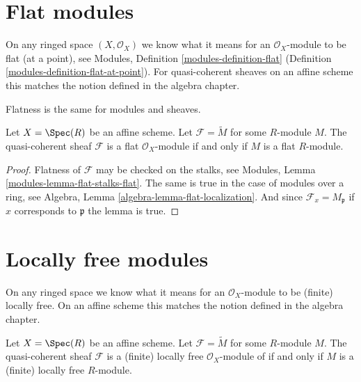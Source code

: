 \section{Flat modules}
\label{section-flat}

\noindent
On any ringed space $(X, \mathcal{O}_X)$
we know what it means for an $\mathcal{O}_X$-module
to be flat (at a point), see
Modules, Definition \ref{modules-definition-flat}
(Definition \ref{modules-definition-flat-at-point}).
For quasi-coherent sheaves on an affine scheme this matches the notion
defined in the algebra chapter.

\begin{lemma}
\label{lemma-flat-module}
\begin{slogan}
Flatness is the same for modules and sheaves.
\end{slogan}
Let $X = \Spec(R)$ be an affine scheme.
Let $\mathcal{F} = \widetilde{M}$ for some $R$-module $M$.
The quasi-coherent sheaf $\mathcal{F}$ is a flat
$\mathcal{O}_X$-module if and only if $M$ is a flat $R$-module.
\end{lemma}

\begin{proof}
Flatness of $\mathcal{F}$ may be checked on the stalks, see
Modules, Lemma \ref{modules-lemma-flat-stalks-flat}.
The same is true in the case of modules over a ring, see
Algebra, Lemma \ref{algebra-lemma-flat-localization}.
And since $\mathcal{F}_x = M_{\mathfrak p}$ if $x$ corresponds
to $\mathfrak p$ the lemma is true.
\end{proof}





\section{Locally free modules}
\label{section-finite-locally-free}

\noindent
On any ringed space we know what it means for an $\mathcal{O}_X$-module
to be (finite) locally free. On an affine scheme this matches the notion
defined in the algebra chapter.

\begin{lemma}
\label{lemma-locally-free-module}
Let $X = \Spec(R)$ be an affine scheme.
Let $\mathcal{F} = \widetilde{M}$ for some $R$-module $M$.
The quasi-coherent sheaf $\mathcal{F}$ is a (finite) locally free
$\mathcal{O}_X$-module of if and only if $M$ is a (finite)
locally free $R$-module.
\end{lemma}

